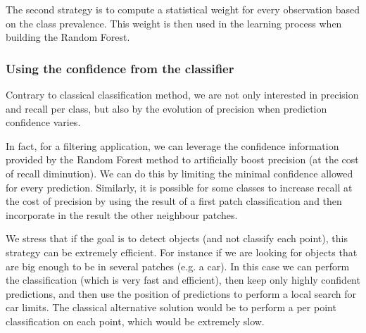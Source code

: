 		The second strategy is to compute a statistical weight for every observation based on the class prevalence. 
		This weight is then used in the learning process when building the Random Forest.
		
		\subsubsection{Using the confidence from the classifier} 
		\label{lod.method.classification.using_confidence}
		Contrary to classical classification method, we are not only interested in precision and recall per class, but also by the evolution of precision when prediction confidence varies.
		
		In fact, for a filtering application, we can leverage the confidence information provided by the Random Forest method to artificially boost precision (at the cost of recall diminution). We can do this by limiting the minimal confidence allowed for every prediction.
		Similarly, it is possible for some classes to increase recall at the cost of precision by using the result of a first patch classification and then incorporate in the result the other neighbour patches. 
		
		We stress that if the goal is to detect objects (and not classify each point), this strategy can be extremely efficient.
		For instance if we are looking for objects that are big enough to be in several patches (e.g. a car).
		In this case we can perform the classification (which is very fast and efficient), then keep only highly confident predictions, and then use the position of predictions to perform a local search for car limits.
		The classical alternative solution would be to perform a per point classification on each point, which would be extremely slow.
		 